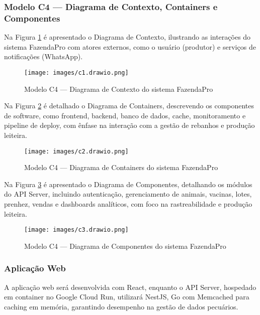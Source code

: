 \documentclass[12pt, a4paper]{article}
\begin{document}
\subsubsection{Modelo C4 — Diagrama de Contexto, Containers e Componentes}
\begin{spacing}{1.5}
Na Figura \ref{fig:C4-Contexto} é apresentado o Diagrama de Contexto, ilustrando as interações do sistema FazendaPro com atores externos, como o usuário (produtor) e serviços de notificações (WhatsApp).

\begin{figure}[H]
    \centering
    \texttt{[image: images/c1.drawio.png]}
    \caption{Modelo C4 — Diagrama de Contexto do sistema FazendaPro}
    \label{fig:C4-Contexto}
\end{figure}

\vspace{0.5cm}

Na Figura \ref{fig:C4-Containers} é detalhado o Diagrama de Containers, descrevendo os componentes de software, como frontend, backend, banco de dados, cache, monitoramento e pipeline de deploy, com ênfase na interação com a gestão de rebanhos e produção leiteira.

\begin{figure}[H]
    \centering
    \texttt{[image: images/c2.drawio.png]}
    \caption{Modelo C4 — Diagrama de Containers do sistema FazendaPro}
    \label{fig:C4-Containers}
\end{figure}

\vspace{0.5cm}

Na Figura \ref{fig:C4-Componentes} é apresentado o Diagrama de Componentes, detalhando os módulos do API Server, incluindo autenticação, gerenciamento de animais, vacinas, lotes, prenhez, vendas e dashboards analíticos, com foco na rastreabilidade e produção leiteira.

\begin{figure}[H]
    \centering
    \texttt{[image: images/c3.drawio.png]}
    \caption{Modelo C4 — Diagrama de Componentes do sistema FazendaPro}
    \label{fig:C4-Componentes}
\end{figure}
\end{spacing}

\subsubsection{Aplicação Web}
\begin{spacing}{1.5}
A aplicação web será desenvolvida com React, enquanto o API Server, hospedado em container no Google Cloud Run, utilizará NestJS, Go com Memcached para caching em memória, garantindo desempenho na gestão de dados pecuários.
\end{spacing}
\end{document}
